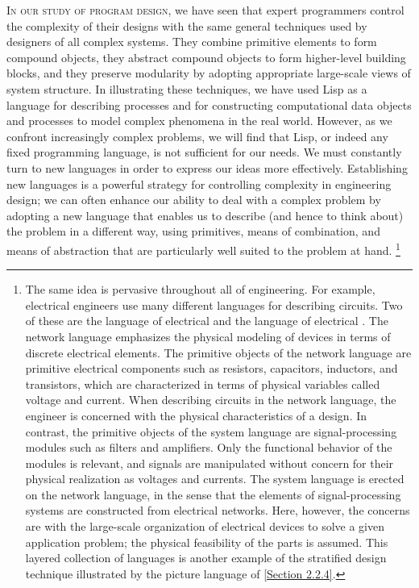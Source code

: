 \lettrine{I}{n our study of program design}, we have seen that expert programmers control the complexity of their designs with the same general techniques used by designers of all complex systems.
They combine primitive elements to form compound objects, they abstract compound objects to form higher-level building blocks, and they preserve modularity by adopting appropriate large-scale views of system structure.
In illustrating these techniques, we have used Lisp as a language for describing processes and for constructing computational data objects and processes to model complex phenomena in the real world.
However, as we confront increasingly complex problems, we will find that Lisp, or indeed any fixed programming language, is not sufficient for our needs.
We must constantly turn to new languages in order to express our ideas more effectively.
Establishing new languages is a powerful strategy for controlling complexity in engineering design;
we can often enhance our ability to deal with a complex problem by adopting a new language that enables us to describe (and hence to think about) the problem in a different way, using primitives, means of combination, and means of abstraction that are particularly well suited to the problem at hand.%
\footnote{
	The same idea is pervasive throughout all of engineering.
	For example, electrical engineers use many different languages for describing circuits.
	Two of these are the language of electrical  and the language of electrical .
	The network language emphasizes the physical modeling of devices in terms of discrete electrical elements.
	The primitive objects of the network language are primitive electrical components such as resistors, capacitors, inductors, and transistors, which are characterized in terms of physical variables called voltage and current.
	When describing circuits in the network language, the engineer is concerned with the physical characteristics of a design.
	In contrast, the primitive objects of the system language are signal-processing modules such as filters and amplifiers.
	Only the functional behavior of the modules is relevant, and signals are manipulated without concern for their physical realization as voltages and currents.
	The system language is erected on the network language, in the sense that the elements of signal-processing systems are constructed from electrical networks.
	Here, however, the concerns are with the large-scale organization of electrical devices to solve a given application problem;
	the physical feasibility of the parts is assumed.
	This layered collection of languages is another example of the stratified design technique illustrated by the picture language of \cref{Section 2.2.4}.
	}

